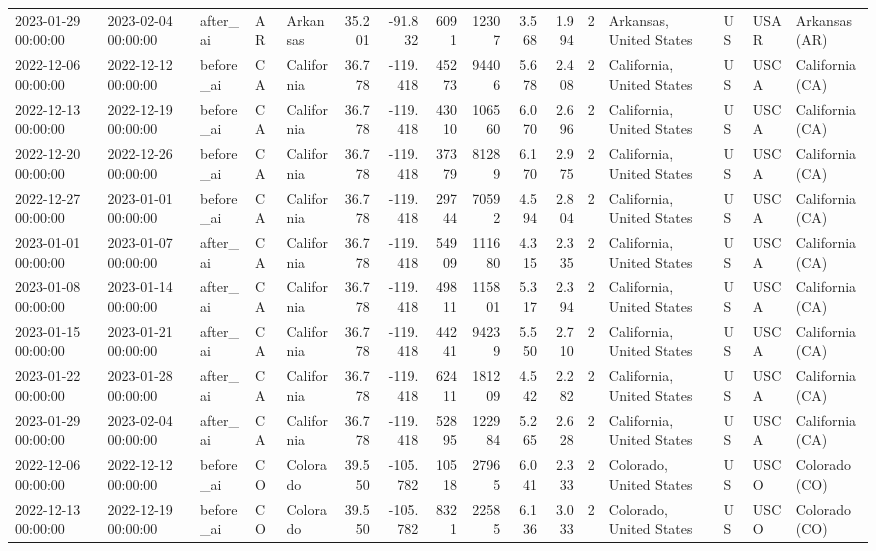 \begin{tabular}{lllllrrrrrrlllll}
2023-01-29 00:00:00 & 2023-02-04 00:00:00 & after\_ai & AR & Arkansas & 35.201 & -91.832 & 6091 & 12307 & 3.568 & 1.994 & 2 & Arkansas, United States & US & USAR & Arkansas (AR) \\
2022-12-06 00:00:00 & 2022-12-12 00:00:00 & before\_ai & CA & California & 36.778 & -119.418 & 45273 & 94406 & 5.678 & 2.408 & 2 & California, United States & US & USCA & California (CA) \\
2022-12-13 00:00:00 & 2022-12-19 00:00:00 & before\_ai & CA & California & 36.778 & -119.418 & 43010 & 106560 & 6.070 & 2.696 & 2 & California, United States & US & USCA & California (CA) \\
2022-12-20 00:00:00 & 2022-12-26 00:00:00 & before\_ai & CA & California & 36.778 & -119.418 & 37379 & 81289 & 6.170 & 2.975 & 2 & California, United States & US & USCA & California (CA) \\
2022-12-27 00:00:00 & 2023-01-01 00:00:00 & before\_ai & CA & California & 36.778 & -119.418 & 29744 & 70592 & 4.594 & 2.804 & 2 & California, United States & US & USCA & California (CA) \\
2023-01-01 00:00:00 & 2023-01-07 00:00:00 & after\_ai & CA & California & 36.778 & -119.418 & 54909 & 111680 & 4.315 & 2.335 & 2 & California, United States & US & USCA & California (CA) \\
2023-01-08 00:00:00 & 2023-01-14 00:00:00 & after\_ai & CA & California & 36.778 & -119.418 & 49811 & 115801 & 5.317 & 2.394 & 2 & California, United States & US & USCA & California (CA) \\
2023-01-15 00:00:00 & 2023-01-21 00:00:00 & after\_ai & CA & California & 36.778 & -119.418 & 44241 & 94239 & 5.550 & 2.710 & 2 & California, United States & US & USCA & California (CA) \\
2023-01-22 00:00:00 & 2023-01-28 00:00:00 & after\_ai & CA & California & 36.778 & -119.418 & 62411 & 181209 & 4.542 & 2.282 & 2 & California, United States & US & USCA & California (CA) \\
2023-01-29 00:00:00 & 2023-02-04 00:00:00 & after\_ai & CA & California & 36.778 & -119.418 & 52895 & 122984 & 5.265 & 2.628 & 2 & California, United States & US & USCA & California (CA) \\
2022-12-06 00:00:00 & 2022-12-12 00:00:00 & before\_ai & CO & Colorado & 39.550 & -105.782 & 10518 & 27965 & 6.041 & 2.333 & 2 & Colorado, United States & US & USCO & Colorado (CO) \\
2022-12-13 00:00:00 & 2022-12-19 00:00:00 & before\_ai & CO & Colorado & 39.550 & -105.782 & 8321 & 22585 & 6.136 & 3.033 & 2 & Colorado, United States & US & USCO & Colorado (CO) \\

\end{tabular}
